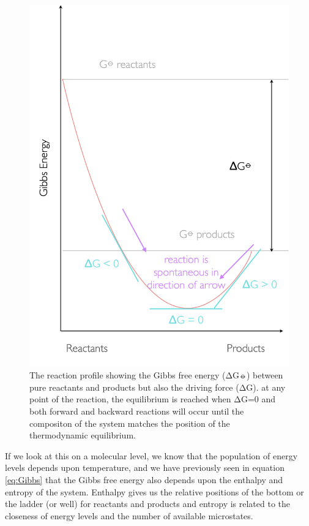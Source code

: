 \documentclass[
]{book}
\begin{document}
\begin{figure}

{\centering \includegraphics[width=0.5\linewidth]{images/gibbsequilibrium} 

}

\caption{The reaction profile showing the Gibbs free energy (ΔG⦵) between pure reactants and products but also the driving force (ΔG). at any point of the reaction, the equilibrium is reached when ΔG=0 and both forward and backward reactions will occur until the compositon of the system matches the position of the thermodynamic equilibrium.}\label{fig:gibbsequilibrium}
\end{figure}

If we look at this on a molecular level, we know that the population of energy levels depends upon temperature, and we have previously seen in equation \eqref{eq:Gibbs} that the Gibbs free energy also depends upon the enthalpy and entropy of the system. Enthalpy gives us the relative positions of the bottom or the ladder (or well) for reactants and products and entropy is related to the closeness of energy levels and the number of available microstates.
\end{document}

